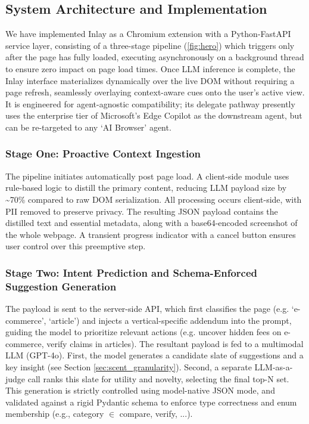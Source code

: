 \documentclass[sigconf]{acmart}
\begin{document}
\subsection{System Architecture and Implementation}
We have implemented Inlay as a Chromium extension with a Python-FastAPI service layer, consisting of a three-stage pipeline (\autoref{fig:hero}) which triggers only after the page has fully loaded, executing asynchronously on a background thread to ensure zero impact on page load times. Once LLM inference is complete, the Inlay interface materializes dynamically over the live DOM without requiring a page refresh, seamlessly overlaying context-aware cues onto the user's active view. It is engineered for agent-agnostic compatibility; its delegate pathway presently uses the enterprise tier of Microsoft's Edge Copilot as the downstream agent, but can be re-targeted to any `AI Browser' agent.

\subsubsection{Stage One: Proactive Context Ingestion}
The pipeline initiates automatically post page load. A client-side module uses rule-based logic to distill the primary content, reducing LLM payload size by \textasciitilde70\% compared to raw DOM serialization. All processing occurs client-side, with PII removed to preserve privacy. The resulting JSON payload contains the distilled text and essential metadata, along with a base64-encoded screenshot of the whole webpage. A transient progress indicator with a cancel button ensures user control over this preemptive step.

\subsubsection{Stage Two: Intent Prediction and Schema-Enforced Suggestion Generation}
The payload is sent to the server-side API, which first classifies the page (e.g. `e-commerce', `article') and injects a vertical-specific addendum into the prompt, guiding the model to prioritize relevant actions (e.g. uncover hidden fees on e-commerce, verify claims in articles). The resultant payload is fed to a multimodal LLM (GPT-4o). First, the model generates a candidate slate of suggestions and a key insight (see Section \ref{sec:scent_granularity}). Second, a separate LLM-as-a-judge call ranks this slate for utility and novelty, selecting the final top-N set. This generation is strictly controlled using model-native JSON mode, and validated against a rigid Pydantic schema to enforce type correctness and enum membership (e.g., category $\in$ {compare, verify, ...}).
\end{document}
